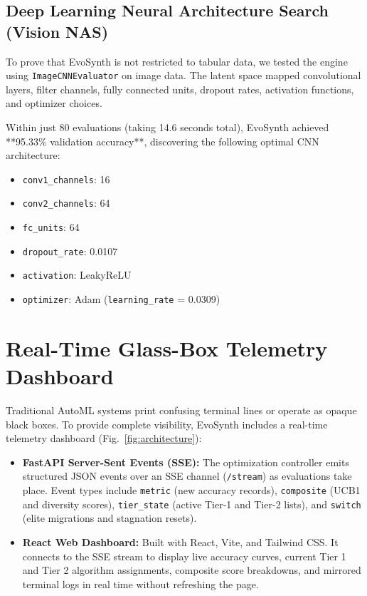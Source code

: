 \documentclass[conference]{IEEEtran}
\begin{document}
\subsection{Deep Learning Neural Architecture Search (Vision NAS)}
To prove that EvoSynth is not restricted to tabular data, we tested the engine using \texttt{ImageCNNEvaluator} on image data. The latent space mapped convolutional layers, filter channels, fully connected units, dropout rates, activation functions, and optimizer choices. 

Within just 80 evaluations (taking 14.6 seconds total), EvoSynth achieved **95.33\% validation accuracy**, discovering the following optimal CNN architecture:
\begin{itemize}
    \item \texttt{conv1\_channels}: 16
    \item \texttt{conv2\_channels}: 64
    \item \texttt{fc\_units}: 64
    \item \texttt{dropout\_rate}: 0.0107
    \item \texttt{activation}: LeakyReLU
    \item \texttt{optimizer}: Adam (\texttt{learning\_rate} = 0.0309)
\end{itemize}

\section{Real-Time Glass-Box Telemetry Dashboard}
Traditional AutoML systems print confusing terminal lines or operate as opaque black boxes. To provide complete visibility, EvoSynth includes a real-time telemetry dashboard (Fig.~\ref{fig:architecture}):
\begin{itemize}
    \item \textbf{FastAPI Server-Sent Events (SSE):} The optimization controller emits structured JSON events over an SSE channel (\texttt{/stream}) as evaluations take place. Event types include \texttt{metric} (new accuracy records), \texttt{composite} (UCB1 and diversity scores), \texttt{tier\_state} (active Tier-1 and Tier-2 lists), and \texttt{switch} (elite migrations and stagnation resets).
    \item \textbf{React Web Dashboard:} Built with React, Vite, and Tailwind CSS. It connects to the SSE stream to display live accuracy curves, current Tier 1 and Tier 2 algorithm assignments, composite score breakdowns, and mirrored terminal logs in real time without refreshing the page.
\end{itemize}
\end{document}
